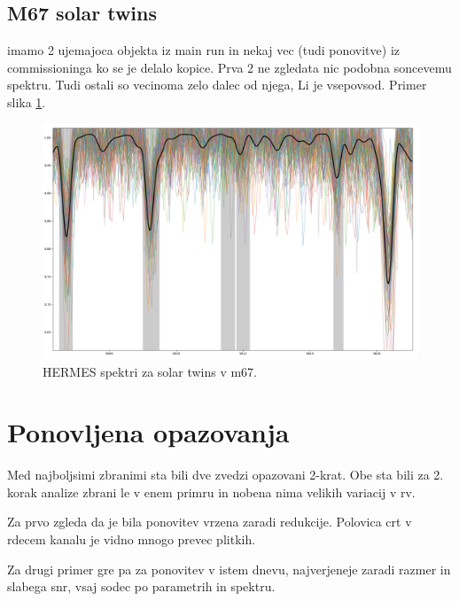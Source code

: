 \subsection{M67 solar twins}
\cite{2008A&A...489..677P} imamo 2 ujemajoca objekta iz main run in nekaj vec (tudi ponovitve) iz commissioninga ko se je delalo kopice. Prva 2 ne zgledata nic podobna soncevemu spektru. Tudi ostali so vecinoma zelo dalec od njega, Li je vsepovsod. Primer slika \ref{fig:twins_67}.
\begin{figure}
	\centering
	\includegraphics[width=\columnwidth]{twins_m67.png}
	\caption{HERMES spektri za solar twins v m67. }
	\label{fig:twins_67}
\end{figure}

\section{Ponovljena opazovanja}
Med najboljsimi zbranimi sta bili dve zvedzi opazovani 2-krat. Obe sta bili za 2. korak analize zbrani le v enem primru in nobena nima velikih variacij v rv. 

Za prvo zgleda da je bila ponovitev vrzena zaradi redukcije. Polovica crt v rdecem kanalu je vidno mnogo prevec plitkih.

Za drugi primer gre pa za ponovitev v istem dnevu, najverjeneje zaradi razmer in slabega snr, vsaj sodec po parametrih in spektru.


